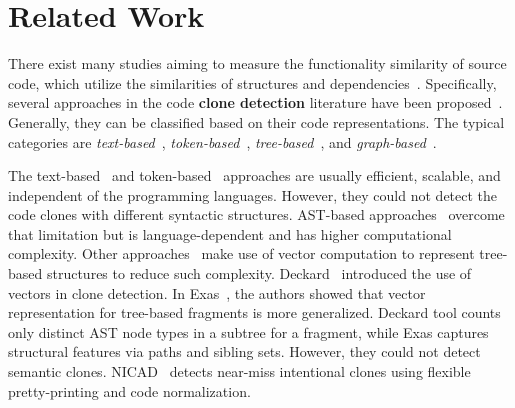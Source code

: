 \section{Related Work}

There exist many studies aiming to measure the functionality
similarity of source code, which utilize the similarities of
structures and 
dependencies~\cite{clone-tse07,roy09,baker97,ccfinder,cpminer,deckard,deckard2,horwitz01,baxter98}.
Specifically, several approaches in the code {\bf clone detection}
literature have been
proposed~\cite{clone-tse07,roy09}. Generally, they can be
classified based on their code representations. The typical categories
are {\em text-based}~\cite{ducasse-icsm99},
{\em token-based}~\cite{baker97,ccfinder,cpminer,mende08},
{\em tree-based}~\cite{baxter98,deckard}, and
{\em graph-based}~\cite{deckard2,horwitz01,liu06}.

The text-based~\cite{ducasse-icsm99} and token-based~\cite{ccfinder}
approaches are usually efficient, scalable, and independent of the
programming languages. However, they could not detect the code clones
with different syntactic structures. AST-based
approaches~\cite{baxter98} overcome that limitation but is
language-dependent and has higher computational complexity. Other
approaches~\cite{fase09,deckard} make use of vector computation to
represent tree-based structures to reduce such complexity.
Deckard~\cite{deckard} introduced the use of vectors in clone
detection. In Exas~\cite{fase09}, the authors showed that vector
representation for tree-based fragments is more generalized. Deckard
tool counts only distinct AST node types in a subtree for a fragment,
while Exas captures structural features via paths and sibling
sets. However, they could not detect semantic clones.
%
NICAD~\cite{nicad08} detects near-miss intentional clones using flexible
pretty-printing and code normalization.

